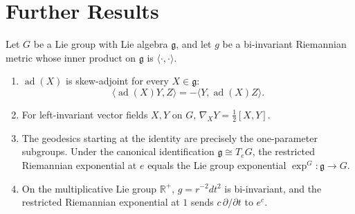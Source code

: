 \section{Further Results}

\begin{proposition}
\label{prop:lie-group-bi-invariant-metric}

Let $G$ be a Lie group with Lie algebra $\mathfrak g$, and let $g$ be a
bi-invariant Riemannian metric whose inner product on $\mathfrak g$ is
$\langle\cdot,\cdot\rangle$.
\begin{enumerate}
\item[(a)] $\operatorname{ad}(X)$ is skew-adjoint for every
$X\in\mathfrak g$:
\[
\langle\operatorname{ad}(X)Y,Z\rangle
=-\langle Y,\operatorname{ad}(X)Z\rangle.
\]
\item[(b)] For left-invariant vector fields $X,Y$ on $G$,
$\nabla_XY=\frac12[X,Y]$.
\item[(c)] The geodesics starting at the identity are precisely the
one-parameter subgroups. Under the canonical identification
$\mathfrak g\cong T_eG$, the restricted Riemannian exponential at $e$ equals
the Lie group exponential $\exp^G:\mathfrak g\to G$.
\item[(d)] On the multiplicative Lie group $\mathbb R^+$,
$g=r^{-2}dt^2$ is bi-invariant, and the restricted Riemannian exponential
at $1$ sends $c\,\partial/\partial t$ to $e^c$.
\end{enumerate}
\end{proposition}


